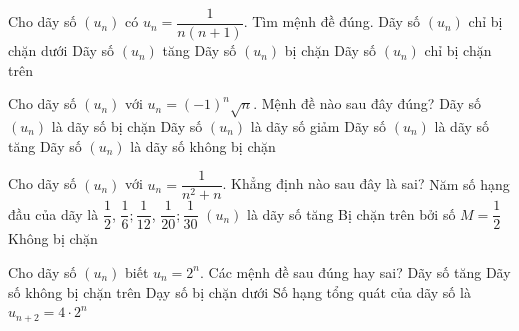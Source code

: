 \begin{ex}%
	Cho dãy số $\left(u_{n} \right)$ có $u_{n} =\dfrac{1}{n\left(n+1\right)}$.  Tìm mệnh đề đúng.
	 \choice
		{Dãy  số $\left(u_{n} \right)$ chỉ bị chặn dưới}
		{Dãy số $\left(u_{n} \right)$ tăng} 
		 {\True Dãy số $\left(u_{n} \right)$ bị chặn}
		{Dãy số $\left(u_{n} \right)$ chỉ bị chặn  trên}
\end{ex}

\begin{ex}%
	Cho dãy số $\left(u_{n} \right)$ với $u_{n} =\left(-1\right)^{n}  \sqrt{n} $. Mệnh đề nào sau đây đúng?
	\choice 
		{Dãy số $\left(u_{n}  \right)$ là dãy số bị chặn}
		{Dãy số $\left(u_{n} \right)$ là dãy số  giảm}
		{Dãy số $\left(u_{n}  \right)$ là dãy số tăng}
		{\True Dãy số $\left(u_{n} \right)$ là dãy số không bị chặn} 
\end{ex}

\begin{ex}%
	Cho dãy số $\left(u_{n} \right)$ với  $u_{n} =\dfrac{1}{n^{2} +n} $. Khẳng định nào sau đây là sai?
	\choice 
		{Năm số hạng đầu của  dãy là $\dfrac{1}{2}$, $\dfrac{1}{6};\dfrac{1}{12}$, $\dfrac{1}{20};\dfrac{1}{30}$}
		{\True $\left(u_{n} \right)$ là  dãy số tăng}
		{Bị chặn trên bởi  số $M=\dfrac{1}{2}$}
		{Không bị chặn} 
\end{ex}



\begin{ex}%
 Cho dãy số $(u_n)$ biết $u_n=2^n$. Các mệnh đề sau  đúng hay sai?
 \choiceTF 
  {\True Dãy số  tăng}
  {\True Dãy số không bị chặn trên} 
  {\True Dạy  số bị chặn dưới}
  {\True Số hạng tổng quát của dãy số  là $u_{n+2}=4\cdot 2^{n}$}
\end{ex}

